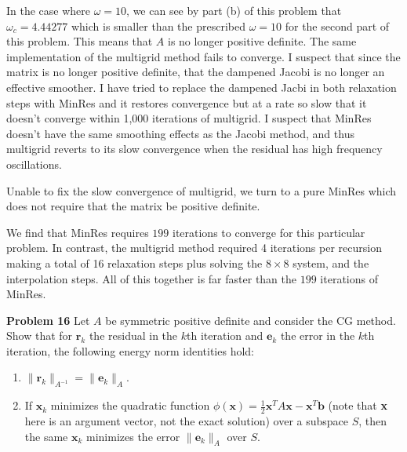 \documentclass[12pt]{article}
\newcommand{\problem}[1]{\hspace{-4 ex} \large \textbf{Problem #1} }
\begin{document}
	
In the case where $\omega = 10$, we can see by part (b) of this problem that $\omega_c = 4.44277$ which is smaller than the prescribed $\omega=10$ for the second part of this problem. This means that $A$ is no longer positive definite. The same implementation of the multigrid method fails to converge. I suspect that since the matrix is no longer positive definite, that the dampened Jacobi is no longer an effective smoother. I have tried to replace the dampened Jacbi in both relaxation steps with MinRes and it restores convergence but at a rate so slow that it doesn't converge within 1,000 iterations of multigrid. I suspect that MinRes doesn't have the same smoothing effects as the Jacobi method, and thus multigrid reverts to its slow convergence when the residual has high frequency oscillations. 

\bigbreak

 
 Unable to fix the slow convergence of multigrid, we turn to a pure MinRes which does not require that the matrix be positive definite.
  
\bigbreak

We find that MinRes requires $199$ iterations to converge for this particular problem. In contrast, the multigrid method required 4 iterations per recursion making a total of 16 relaxation steps plus solving the $8 \times 8$ system, and the interpolation steps. All of this together is far faster than the $199$ iterations of MinRes. 


\bigbreak

\problem{16} Let $ A $ be symmetric positive definite and consider the CG method. Show that for $ \textbf{r}_k $ the residual in the $ k $th iteration and $ \textbf{e}_k $ the error in the $ k $th iteration, the following energy norm identities hold:
\begin{enumerate}[leftmargin=0.6cm,label=(\alph*)]
	\item $ \lVert \textbf{r}_k \rVert_{A^{-1}} = \lVert \textbf{e}_k \rVert_{A}$.
	\item If $ \textbf{x}_k $ minimizes the quadratic function $ \phi(\textbf{x}) = \frac{1}{2}\textbf{x}^TA\textbf{x} - \textbf{x}^T\textbf{b} $ (note that \textbf{x} here is an argument vector, not the exact solution) over a subspace $ S $, then the same $ \textbf{x}_k $ minimizes the error $ \lVert \textbf{e}_k \rVert_{A} $ over $ S $.
\end{enumerate}
\end{document}
